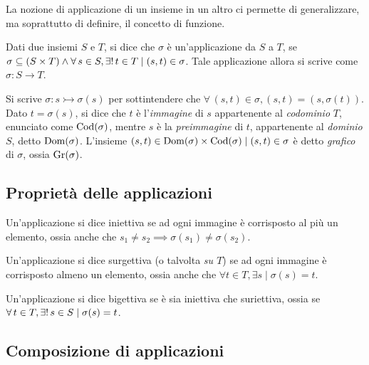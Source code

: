 La nozione di applicazione di un insieme in un altro ci permette
di generalizzare, ma soprattutto di definire, il concetto di
funzione.

\begin{definition}[Applicazione]
    Dati due insiemi $S$ e $T$, si dice che $\sigma$ è un'applicazione
    da $S$ a $T$, se $\sigma \subseteq (S \times T) \land \forall s \in S, \existsone
        t \in T \mid (s, t) \in \sigma$. Tale applicazione allora si scrive come
    $\sigma : S \to T$.
\end{definition}

Si scrive $\sigma : s \rightarrowtail \sigma(s)$ per sottintendere che
$\forall \, (s, t) \in \sigma, (s, t) = (s, \sigma(t))$. Dato
$t=\sigma(s)$, si dice che $t$ è l'\textit{immagine} di $s$ appartenente
al \textit{codominio} $T$, enunciato come $\operatorname{Cod}(\sigma)$, mentre $s$ è
la \textit{preimmagine} di $t$, appartenente al \textit{dominio} $S$, detto
$\operatorname{Dom}(\sigma)$. L'insieme ${(s, t) \in \operatorname{Dom}(\sigma) \times \operatorname{Cod}(\sigma) \mid (s, t) \in \sigma}$ è
detto \textit{grafico} di $\sigma$, ossia $\operatorname{Gr}(\sigma)$.


\subsection{Proprietà delle applicazioni}

\begin{definition}[Iniettività]
    Un'applicazione si dice iniettiva se ad ogni immagine
    è corrisposto al più un elemento, ossia anche che
    $s_1 \neq s_2 \implies \sigma(s_1) \neq \sigma(s_2)$.
\end{definition}

\begin{definition}[Surgettività]
    Un'applicazione si dice surgettiva (o talvolta \textit{su $T$}) se ad ogni immagine
    è corrisposto almeno un elemento, ossia anche che
    $\forall t \in T, \exists s \mid \sigma(s) = t$.
\end{definition}

\begin{definition}[Bigettività]
    Un'applicazione si dice bigettiva se è sia iniettiva che
    suriettiva, ossia se $\forall t \in T, \existsone s \in S
        \mid \sigma(s) = t$.
\end{definition}

\subsection{Composizione di applicazioni}

